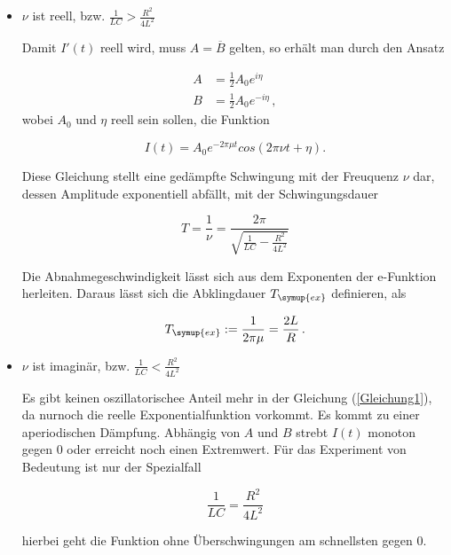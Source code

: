 \begin{itemize}
  \item $\nu $ ist reell, bzw. $\frac{1}{LC} > \frac{R^2}{4L^2}$

  Damit $I'(t)$ reell wird, muss $A=\overline{B}$ gelten, so erhält man durch den Ansatz

  \begin{align*}
    A &= \frac{1}{2} A_0 e^{i \eta}\\
    B &= \frac{1}{2} A_0 e^{-i \eta} \, ,
  \end{align*}
  wobei $A_0$ und $\eta$ reell sein sollen, die Funktion

  \begin{equation*}
    I(t) = A_0 e^{-2 \pi \mu t} cos(2 \pi \nu t + \eta).
  \end{equation*}

  Diese Gleichung stellt eine gedämpfte Schwingung mit der Freuquenz $\nu$ dar, dessen Amplitude exponentiell
  abfällt, mit der Schwingungsdauer

  \begin{equation*}
    T = \frac{1}{\nu} = \frac{2 \pi}{\sqrt{\frac{1}{LC} - \frac{R^2}{4L^2}}}
  \end{equation*}

  Die Abnahmegeschwindigkeit lässt sich aus dem Exponenten der e-Funktion herleiten. Daraus lässt sich
  die Abklingdauer $T_{\symup{ex}}$ definieren, als

  \begin{equation}
    T_{\symup{ex}} := \frac{1}{2 \pi \mu} = \frac{2L}{R} \, .
  \end{equation}

  \item $\nu $ ist imaginär, bzw. $\frac{1}{LC} < \frac{R^2}{4L^2}$

  Es gibt keinen oszillatorischee Anteil mehr in der Gleichung (\ref{Gleichung1}), da nurnoch die reelle
  Exponentialfunktion vorkommt. Es kommt zu einer aperiodischen Dämpfung. Abhängig von $A$ und $B$ strebt
  $I(t)$ monoton gegen 0 oder erreicht noch einen Extremwert. Für das Experiment von Bedeutung ist nur
  der Spezialfall

  \begin{equation}
    \frac{1}{LC} = \frac{R^2}{4L^2}
  \end{equation}

  hierbei geht die Funktion ohne Überschwingungen am schnellsten gegen 0.

\end{itemize}

